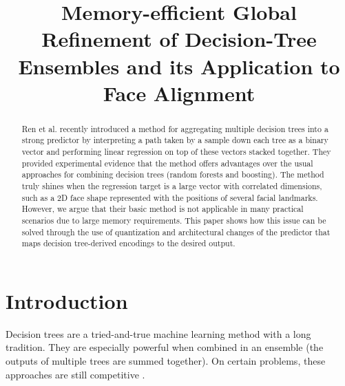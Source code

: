 \documentclass{article}
\title
{
	Memory-efficient Global Refinement of Decision-Tree Ensembles and its Application to Face Alignment
}
\begin{document}
\address
{
	\small$^{\dagger}$University of Zagreb, Faculty of Electrical Engineering and Computing, Unska 3, 10000 Zagreb, Croatia\\
	\small$^{\ddagger}$Computer Vision Laboratory, Dept. of Electrical Engineering, Link\"oping University, SE-581 83 Link\"oping, Sweden
}

\maketitle

\begin{abstract}
	Ren et al. recently introduced a method for aggregating multiple decision trees into a strong predictor by interpreting a path taken by a sample down each tree as a binary vector and performing linear regression on top of these vectors stacked together.
	They provided experimental evidence that the method offers advantages over the usual approaches for combining decision trees (random forests and boosting).
	The method truly shines when the regression target is a large vector with correlated dimensions, such as a 2D face shape represented with the positions of several facial landmarks.
	However, we argue that their basic method is not applicable in many practical scenarios due to large memory requirements.
	This paper shows how this issue can be solved through the use of quantization and architectural changes of the predictor that maps decision tree-derived encodings to the desired output.
\end{abstract}

\section{Introduction}
	Decision trees \cite{cart} are a tried-and-true machine learning method with a long tradition.
	They are especially powerful when combined in an ensemble \cite{rand_forests}
	(the outputs of multiple trees are summed together).
	On certain problems, these approaches are still competitive \cite{doweneed,bestqm}.
\end{document}
